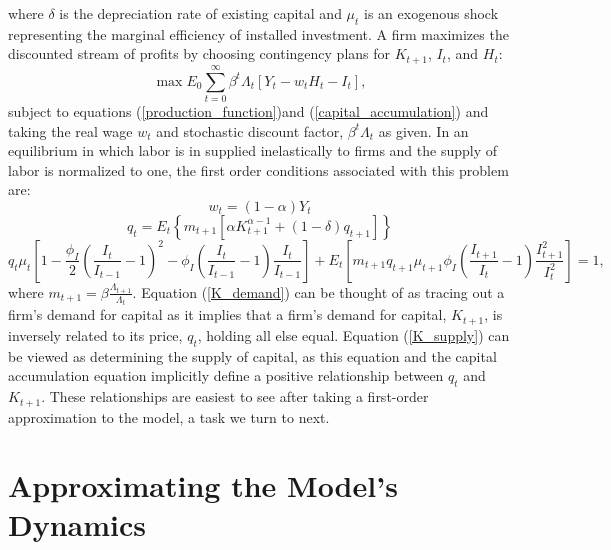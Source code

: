 \documentclass[11pt,fleqn]{article}
\begin{document}
where $\delta$ is the depreciation rate of existing capital and $\mu_t$ is an exogenous shock representing the marginal efficiency of installed investment.  A firm maximizes the discounted stream of profits by choosing contingency plans for $K_{t+1}$, $I_t$, and $H_t$:
\begin{equation}
\max E_0 \sum^{\infty}_{t=0} \beta^t \Lambda_t \left[Y_t - w_t H_t - I_t  \right],
\end{equation}
subject to equations (\ref{production_function})and (\ref{capital_accumulation}) and taking the real wage $w_t$ and stochastic discount factor, $\beta^t \Lambda_t$ as given.  In an equilibrium in which labor is in supplied inelastically to firms and the supply of labor is normalized to one, the first order conditions associated with this problem are:
\begin{equation}
w_t = (1-\alpha) Y_t
\end{equation}
\begin{equation}
q_t = E_t \left\{ m_{t+1} \left[ \alpha K^{\alpha-1}_{t+1} + (1-\delta) q_{t+1} \right]  \right\} \label{K_demand}
\end{equation}
\begin{equation}
q_t \mu_t \left[ 1 - \frac{\phi_I}{2}\left(\frac{I_t}{I_{t-1}}-1\right)^2 - \phi_I \left(\frac{I_t}{I_{t-1}}-1\right) \frac{I_t}{I_{t-1}} \right]
+ E_t \left[ m_{t+1} q_{t+1} \mu_{t+1} \phi_I \left(\frac{I_{t+1}}{I_{t}}-1\right) \frac{I^2_{t+1}}{I^2_{t}} \right] =1,  \label{K_supply}
\end{equation}
where $m_{t+1} = \beta \frac{\Lambda_{t+1}}{\Lambda_t}$.  Equation (\ref{K_demand}) can be thought of as tracing out a firm's demand for capital as it implies that a firm's demand for capital, $K_{t+1}$, is inversely related to its price, $q_t$, holding all else equal.  Equation (\ref{K_supply}) can be viewed as determining the supply of capital, as this equation and the capital accumulation equation implicitly define a positive relationship between $q_t$ and $K_{t+1}$.  These relationships are easiest to see after taking a first-order approximation to the model, a task we turn to next.

\section{Approximating the Model's Dynamics}
\end{document}
